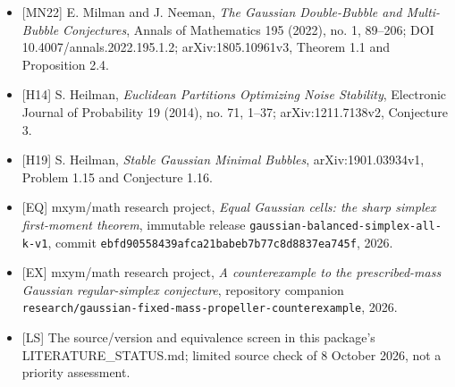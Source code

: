 \documentclass[
  11pt,
]{article}
\providecommand{\tightlist}{%
  \setlength{\itemsep}{0pt}\setlength{\parskip}{0pt}}
\begin{document}
\begin{itemize}
\tightlist
\item
  {[}MN22{]} E. Milman and J. Neeman, \emph{The Gaussian Double-Bubble
  and Multi-Bubble Conjectures}, Annals of Mathematics 195 (2022), no.
  1, 89--206; DOI 10.4007/annals.2022.195.1.2; arXiv:1805.10961v3,
  Theorem 1.1 and Proposition 2.4.
\item
  {[}H14{]} S. Heilman, \emph{Euclidean Partitions Optimizing Noise
  Stability}, Electronic Journal of Probability 19 (2014), no. 71,
  1--37; arXiv:1211.7138v2, Conjecture 3.
\item
  {[}H19{]} S. Heilman, \emph{Stable Gaussian Minimal Bubbles},
  arXiv:1901.03934v1, Problem 1.15 and Conjecture 1.16.
\item
  {[}EQ{]} mxym/math research project, \emph{Equal Gaussian cells: the
  sharp simplex first-moment theorem}, immutable release
  \nolinkurl{gaussian-balanced-simplex-all-k-v1}, commit
  \nolinkurl{ebfd90558439afca21babeb7b77c8d8837ea745f}, 2026.
\item
  {[}EX{]} mxym/math research project, \emph{A counterexample to the
  prescribed-mass Gaussian regular-simplex conjecture}, repository
  companion \nolinkurl{research/gaussian-fixed-mass-propeller-counterexample}, 2026.
\item
  {[}LS{]} The source/version and equivalence screen in this package's
  LITERATURE\_STATUS.md; limited source check of 8 October 2026, not a
  priority assessment.
\end{itemize}
\end{document}
